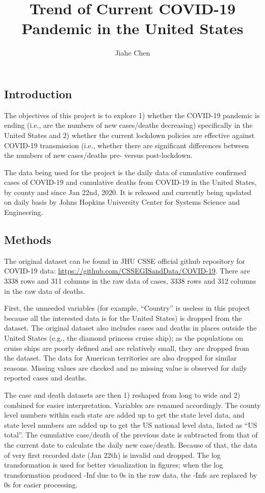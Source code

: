 \documentclass[
]{article}
\title{Trend of Current COVID-19 Pandemic in the United States}
\author{Jiahe Chen}
\date{}
\begin{document}
\maketitle

\hypertarget{introduction}{%
\subsection{Introduction}\label{introduction}}

The objectives of this project is to explore 1) whether the COVID-19
pandemic is ending (i.e., are the numbers of new cases/deaths
decreasing) specifically in the United States and 2) whether the current
lockdown policies are effective against COVID-19 transmission (i.e.,
whether there are significant differences between the numbers of new
cases/deaths pre- versus post-lockdown.

The data being used for the project is the daily data of cumulative
confirmed cases of COVID-19 and cumulative deaths from COVID-19 in the
United States, by county and since Jan 22nd, 2020. It is released and
currently being updated on daily basis by Johns Hopkins University
Center for Systems Science and Engineering.

\hypertarget{methods}{%
\subsection{Methods}\label{methods}}

The original dataset can be found in JHU CSSE official github repository
for COVID-19 data: \url{https://github.com/CSSEGISandData/COVID-19}.
There are 3338 rows and 311 columns in the raw data of cases, 3338 rows
and 312 columns in the raw data of deaths.

First, the unneeded variables (for example, ``Country'' is useless in
this project because all the interested data is for the United States)
is dropped from the dataset. The original dataset also includes cases
and deaths in places outside the United States (e.g., the diamond
princess cruise ship); as the populations on cruise ships are poorly
defined and are relatively small, they are dropped from the dataset. The
data for American territories are also dropped for similar reasons.
Missing values are checked and no missing value is observed for daily
reported cases and deaths.

The case and death datasets are then 1) reshaped from long to wide and
2) combined for easier interpretation. Variables are renamed
accordingly. The county level numbers within each state are added up to
get the state level data, and state level numbers are added up to get
the US national level data, listed as ``US total''. The cumulative
case/death of the previous date is subtracted from that of the current
date to calculate the daily new case/death. Because of that, the data of
very first recorded date (Jan 22th) is invalid and dropped. The log
transformation is used for better visualization in figures; when the log
transformation produced -Inf due to 0s in the raw data, the -Infs are
replaced by 0s for easier processing.
\end{document}
